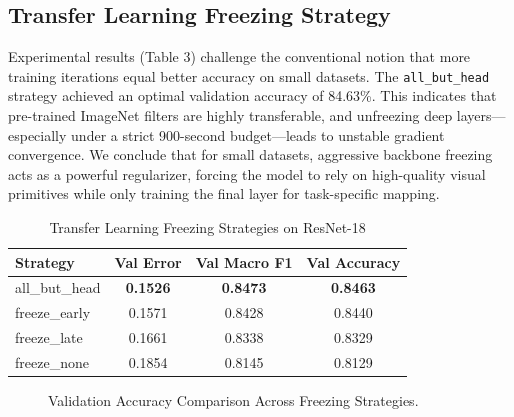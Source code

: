 \documentclass[12pt,a4paper]{article}
\begin{document}
\vspace{1.5em}

\subsection{Transfer Learning Freezing Strategy}
Experimental results (Table 3) challenge the conventional notion that more training iterations equal better accuracy on small datasets. The \texttt{all\_but\_head} strategy achieved an optimal validation accuracy of 84.63\%. This indicates that pre-trained ImageNet filters are highly transferable, and unfreezing deep layers—especially under a strict 900-second budget—leads to unstable gradient convergence. We conclude that for small datasets, aggressive backbone freezing acts as a powerful regularizer, forcing the model to rely on high-quality visual primitives while only training the final layer for task-specific mapping.

\vspace{0.8em}

\begin{table}[H]
\centering
\caption{Transfer Learning Freezing Strategies on ResNet-18}
\begin{tabular}{lccc}
\toprule
Strategy & Val Error & Val Macro F1 & Val Accuracy \\
\midrule
all\_but\_head & \textbf{0.1526} & \textbf{0.8473} & \textbf{0.8463} \\
freeze\_early & 0.1571 & 0.8428 & 0.8440 \\
freeze\_late & 0.1661 & 0.8338 & 0.8329 \\
freeze\_none & 0.1854 & 0.8145 & 0.8129 \\
\bottomrule
\end{tabular}
\end{table}

\begin{figure}[H]
    \centering
    \caption{Validation Accuracy Comparison Across Freezing Strategies.}
\end{figure}
\end{document}
